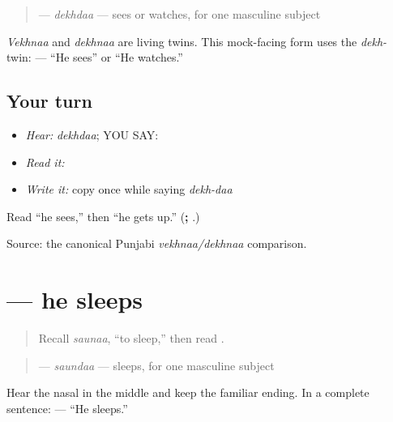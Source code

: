 \begin{grammarlens}[title={Grammar Lens: use the dekh- twin}]
\begin{quote}
\textbf{} — \emph{dekhdaa} — sees or watches, for one masculine subject
\end{quote}

\emph{Vekhnaa} and \emph{dekhnaa} are living twins. This mock-facing form uses the \emph{dekh-} twin: \textbf{  } — “He sees” or “He watches.”
\end{grammarlens}

\subsection*{Your turn}
\begin{itemize}
\raggedright
  \item \emph{Hear:} \emph{dekhdaa}; YOU SAY: \textbf{}
  \item \emph{Read it:} \textbf{}
  \item \emph{Write it:} copy \textbf{} once while saying \emph{dekh-daa}
\end{itemize}

\begin{tcolorbox}[breakable,colback=teal!4,colframe=teal!35!black,title={Before you move on}]
Read “he sees,” then “he gets up.” (\textbf{; }.)

Source: the canonical Punjabi \emph{vekhnaa/dekhnaa} comparison.
\end{tcolorbox}
\section[\texorpdfstring{\pa{ਸੌਂਦਾ} (saundaa)}{ਸੌਂਦਾ (saundaa)}]{ — he sleeps}

\label{lesson:PA-C183-saunda}



\begin{quote}
Recall \emph{saunaa}, “to sleep,” then read \textbf{}.
\end{quote}

\begin{grammarlens}[title={Grammar Lens: one small sound change}]
\begin{quote}
\textbf{} — \emph{saundaa} — sleeps, for one masculine subject
\end{quote}

Hear the nasal in the middle and keep the familiar ending. In a complete sentence: \textbf{  } — “He sleeps.”
\end{grammarlens}

